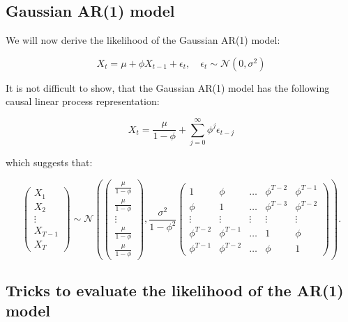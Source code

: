 \documentclass[12] {article}
\begin{document}
\newpage

\subsection{Gaussian AR(1) model}
   
We will now derive the likelihood of the Gaussian AR(1) model:

\[ X_t  = \mu + \phi X_{t-1} + \epsilon_{t}, \quad \epsilon_{t} \sim \mathcal{N}(0,\sigma^2) \] 

\noindent It is not difficult to show, that the Gaussian AR(1) model has the following causal linear process representation:

\[ X_t = \frac{\mu}{1-\phi} + \sum_{j=0}^{\infty} \phi^j \epsilon_{t-j} \]

\noindent which suggests that:

\begin{equation}
\begin{pmatrix}
X_1 \\ X_2 \\ \vdots \\ X_{T-1} \\ X_{T} 
\end{pmatrix}
\sim \mathcal{N} \left( 
\begin{pmatrix}
 \frac{\mu}{1-\phi} \\ \frac{\mu}{1-\phi} \\ \vdots \\ \frac{\mu}{1-\phi} \\ \frac{\mu}{1-\phi}
\end{pmatrix}, 
\frac{\sigma^2}{1-\phi^2} 
\begin{pmatrix}
1 & \phi & \ldots & \phi^{T-2} & \phi^{T-1} \\
\phi & 1 & \ldots & \phi^{T-3} & \phi^{T-2} \\
\vdots & \vdots & \vdots & \vdots & \vdots \\
\phi^{T-2} & \phi^{T-1} & \ldots & 1 & \phi \\
\phi^{T-1} & \phi^{T-2} & \ldots & \phi & 1 
\end{pmatrix}
\right).
\end{equation}

\subsection{Tricks to evaluate the likelihood of the AR(1) model}  
   
\end{document}
